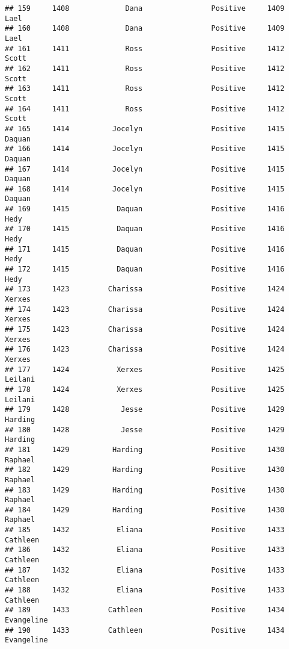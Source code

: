 \documentclass[
]{article}
\begin{document}
\begin{verbatim}
## 159     1408             Dana                Positive     1409             Lael
## 160     1408             Dana                Positive     1409             Lael
## 161     1411             Ross                Positive     1412            Scott
## 162     1411             Ross                Positive     1412            Scott
## 163     1411             Ross                Positive     1412            Scott
## 164     1411             Ross                Positive     1412            Scott
## 165     1414          Jocelyn                Positive     1415           Daquan
## 166     1414          Jocelyn                Positive     1415           Daquan
## 167     1414          Jocelyn                Positive     1415           Daquan
## 168     1414          Jocelyn                Positive     1415           Daquan
## 169     1415           Daquan                Positive     1416             Hedy
## 170     1415           Daquan                Positive     1416             Hedy
## 171     1415           Daquan                Positive     1416             Hedy
## 172     1415           Daquan                Positive     1416             Hedy
## 173     1423         Charissa                Positive     1424           Xerxes
## 174     1423         Charissa                Positive     1424           Xerxes
## 175     1423         Charissa                Positive     1424           Xerxes
## 176     1423         Charissa                Positive     1424           Xerxes
## 177     1424           Xerxes                Positive     1425          Leilani
## 178     1424           Xerxes                Positive     1425          Leilani
## 179     1428            Jesse                Positive     1429          Harding
## 180     1428            Jesse                Positive     1429          Harding
## 181     1429          Harding                Positive     1430          Raphael
## 182     1429          Harding                Positive     1430          Raphael
## 183     1429          Harding                Positive     1430          Raphael
## 184     1429          Harding                Positive     1430          Raphael
## 185     1432           Eliana                Positive     1433         Cathleen
## 186     1432           Eliana                Positive     1433         Cathleen
## 187     1432           Eliana                Positive     1433         Cathleen
## 188     1432           Eliana                Positive     1433         Cathleen
## 189     1433         Cathleen                Positive     1434       Evangeline
## 190     1433         Cathleen                Positive     1434       Evangeline

\end{verbatim}
\end{document}
